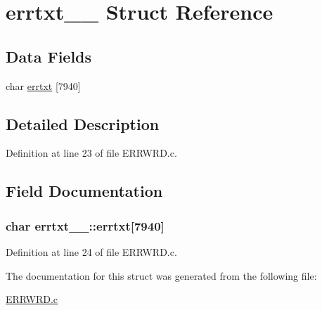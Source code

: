 \hypertarget{structerrtxt__1__}{}\section{errtxt\+\_\+\_\+ Struct Reference}
\label{structerrtxt__1__}
\subsection*{Data Fields}
\begin{DoxyCompactItemize}
\item 
char \hyperlink{structerrtxt__1___a6f34d99ce286014156ea8416d724922d}{errtxt} \mbox{[}7940\mbox{]}
\end{DoxyCompactItemize}


\subsection{Detailed Description}


Definition at line 23 of file E\+R\+R\+W\+R\+D.\+c.



\subsection{Field Documentation}
\subsubsection[{\texorpdfstring{errtxt}{errtxt}}]{\setlength{\rightskip}{0pt plus 5cm}char errtxt\+\_\+\_\+\+::errtxt\mbox{[}7940\mbox{]}}\hypertarget{structerrtxt__1___a6f34d99ce286014156ea8416d724922d}{}\label{structerrtxt__1___a6f34d99ce286014156ea8416d724922d}


Definition at line 24 of file E\+R\+R\+W\+R\+D.\+c.



The documentation for this struct was generated from the following file\+:\begin{DoxyCompactItemize}
\item 
\hyperlink{ERRWRD_8c}{E\+R\+R\+W\+R\+D.\+c}\end{DoxyCompactItemize}
